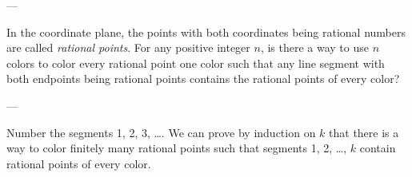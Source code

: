 
---

In the coordinate plane, the points with both coordinates being rational numbers are called \emph{rational points}. For any positive integer $n$, is there a way to use $n$ colors to color every rational point one color such that any line segment with both endpoints being rational points contains the rational points of every color?

---

Number the segments 1, 2, 3, \ldots. We can prove by induction on $k$ that there is a way to color finitely many rational points such that segments 1, 2, \ldots, $k$ contain rational points of every color.

